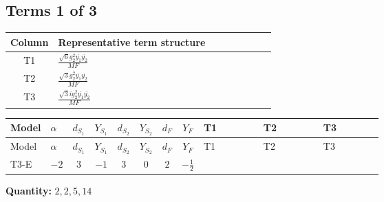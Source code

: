 \documentclass[8pt]{article}
\begin{document}
\begin{landscape}
\subsection*{Terms 1 of 3}
\begin{center}
\begin{tabular}{@{}c >{\raggedright\arraybackslash}p{0.82\linewidth}@{}}
\toprule
Column & Representative term structure \\
\midrule
T1 & \(\displaystyle \frac{\sqrt{6} g_{2}^{2} \overline{y_{1}} \overline{y_{2}}}{MF}\) \\
\midrule
T2 & \(\displaystyle \frac{\sqrt{3} g_{2}^{2} \overline{y_{1}} \overline{y_{2}}}{MF}\) \\
\midrule
T3 & \(\displaystyle \frac{\sqrt{3} i g_{2}^{2} \overline{y_{1}} \overline{y_{2}}}{MF}\) \\
\midrule
\bottomrule
\end{tabular}
\end{center}
\smallskip
\tiny
\begin{longtable}{@{}llcccccc >{\raggedright\arraybackslash}p{0.21\linewidth} >{\raggedright\arraybackslash}p{0.21\linewidth} >{\raggedright\arraybackslash}p{0.21\linewidth}@{}}
\toprule
Model & $\alpha$ & $d_{S_1}$ & $Y_{S_1}$ & $d_{S_2}$ & $Y_{S_2}$ & $d_F$ & $Y_F$ & T1 & T2 & T3 \\
\midrule
\endfirsthead
\toprule
Model & $\alpha$ & $d_{S_1}$ & $Y_{S_1}$ & $d_{S_2}$ & $Y_{S_2}$ & $d_F$ & $Y_F$ & T1 & T2 & T3 \\
\midrule
\endhead
T3-E & $-2$ & $3$ & $-1$ & $3$ & $0$ & $2$ & $-\frac{1}{2}$ & \scriptsize\adjustbox{max width=\linewidth}{$\begin{gathered} - \frac{\sqrt{6} g_{2}^{2} \overline{y_{1}} \overline{y_{2}}}{3 MF}\end{gathered}$} & \scriptsize\adjustbox{max width=\linewidth}{$\begin{gathered} - \frac{\sqrt{3} g_{2}^{2} \overline{y_{1}} \overline{y_{2}}}{6 MF}\end{gathered}$} & \scriptsize\adjustbox{max width=\linewidth}{$\begin{gathered} - \frac{49 \sqrt{3} i g_{2}^{2} \overline{y_{1}} \overline{y_{2}}}{24 MF}\end{gathered}$} \\
\midrule
\bottomrule
\end{longtable}
\clearpage
\noindent\textbf{Quantity: }$\mathrm{2,2,5,14}$\par\smallskip

\end{landscape}
\end{document}
